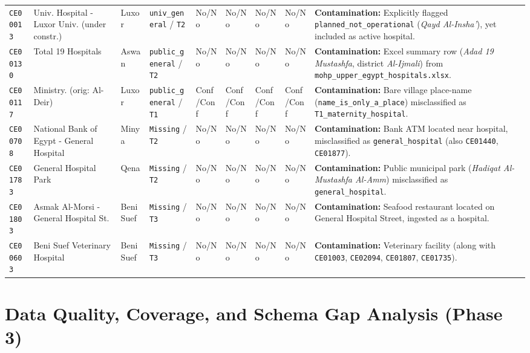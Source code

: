 \documentclass[10pt,a4paper]{article}
\begin{document}
{\begin{longtable}{p{1.05cm} p{2.7cm} p{1.1cm} p{1.95cm} p{0.95cm} p{0.95cm} p{0.95cm} p{0.95cm} p{3.4cm}}
\texttt{CE00013} & Univ. Hospital - Luxor Univ. (under constr.) & Luxor & \texttt{univ\_general} / \texttt{T2} & No/No & No/No & No/No & No/No & \textbf{Contamination:} Explicitly flagged \texttt{planned\_not\_operational} (\textit{Qayd Al-Insha'}), yet included as active hospital. \\[0.3em]
\texttt{CE00130} & Total 19 Hospitals & Aswan & \texttt{public\_general} / \texttt{T2} & No/No & No/No & No/No & No/No & \textbf{Contamination:} Excel summary row (\textit{Adad 19 Mustashfa}, district \textit{Al-Ijmali}) from \texttt{mohp\_upper\_egypt\_hospitals.xlsx}. \\[0.3em]
\texttt{CE00117} & Ministry. (orig: Al-Deir) & Luxor & \texttt{public\_general} / \texttt{T1} & Conf/Conf & Conf/Conf & Conf/Conf & Conf/Conf & \textbf{Contamination:} Bare village place-name (\texttt{name\_is\_only\_a\_place}) misclassified as \texttt{T1\_maternity\_hospital}. \\[0.3em]
\texttt{CE00708} & National Bank of Egypt - General Hospital & Minya & \texttt{Missing} / \texttt{T2} & No/No & No/No & No/No & No/No & \textbf{Contamination:} Bank ATM located near hospital, misclassified as \texttt{general\_hospital} (also \texttt{CE01440}, \texttt{CE01877}). \\[0.3em]
\texttt{CE01783} & General Hospital Park & Qena & \texttt{Missing} / \texttt{T2} & No/No & No/No & No/No & No/No & \textbf{Contamination:} Public municipal park (\textit{Hadiqat Al-Mustashfa Al-Amm}) misclassified as \texttt{general\_hospital}. \\[0.3em]
\texttt{CE01803} & Asmak Al-Morsi - General Hospital St. & Beni Suef & \texttt{Missing} / \texttt{T3} & No/No & No/No & No/No & No/No & \textbf{Contamination:} Seafood restaurant located on General Hospital Street, ingested as a hospital. \\[0.3em]
\texttt{CE00603} & Beni Suef Veterinary Hospital & Beni Suef & \texttt{Missing} / \texttt{T3} & No/No & No/No & No/No & No/No & \textbf{Contamination:} Veterinary facility (along with \texttt{CE01003}, \texttt{CE02094}, \texttt{CE01807}, \texttt{CE01735}). \\
\end{longtable}
}

\section{Data Quality, Coverage, and Schema Gap Analysis (Phase 3)}
\end{document}
